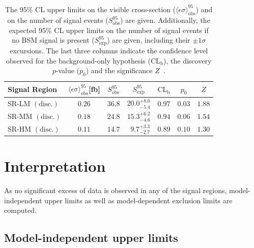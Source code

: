 \begin{table}
\begin{center}
\begin{tabular}{lcccccc}
\toprule
\textbf{Signal Region}                       & $\langle\epsilon{\mathrm{ \sigma}}\rangle_{\mathrm{ obs}}^{95}$[fb]  &  $S_{\mathrm{ obs}}^{95}$  & $S_{\mathrm{ exp}}^{95}$ & $\textrm{CL}_{\textrm{b}}$ & $p_{0}$ & $Z$  \\
\midrule
 SR-LM $\mathrm{(disc.)}$    & $0.26$ &  $36.8$ & $ { 20.0 }^{ +8.0 }_{ -5.4 }$ & $0.97$ & $ 0.03$&$1.88$ \\%
 SR-MM $\mathrm{(disc.)}$    & $0.18$ &  $24.8$ & $ { 15.3 }^{ +6.2 }_{ -4.6 }$ & $0.94$ & $ 0.06$&$1.54$ \\%
 SR-HM $\mathrm{(disc.)}$    & $0.11$ &  $14.7$ & $ { ~~9.7 }^{ +3.3 }_{ -2.7 }$ & $0.89$ & $ 0.10$&$1.30$ \\%

\bottomrule
\end{tabular}
\caption[Breakdown of upper limits.]{
The 95\% CL upper limits on the visible cross-section ($\langle\epsilon\sigma\rangle_{\mathrm{ obs}}^{95}$) and on the number of
signal events ($S_{\mathrm{ obs}}^{95}$) are given. Additionally, the expected 95\% CL upper limits on the number of signal events if no BSM signal is present ($S_{\mathrm{ exp}}^{95}$) are given, including their $\pm 1\sigma$ excursions. The last three columns indicate the confidence level observed for the background-only hypothesis ($\textrm{CL}_{\textrm{b}}$), the discovery $p$-value ($p_{0}$) and the significance $Z$~\cite{Cousins:2007bmb}.}
\label{tab:upperlimit_toys}
\end{center}
\end{table}

\section{Interpretation}\label{sec:results_interpretation}

As no significant excess of data is observed in any of the signal regions, model-independent upper limits as well as model-dependent exclusion limits are computed.

\subsection{Model-independent upper limits} 

